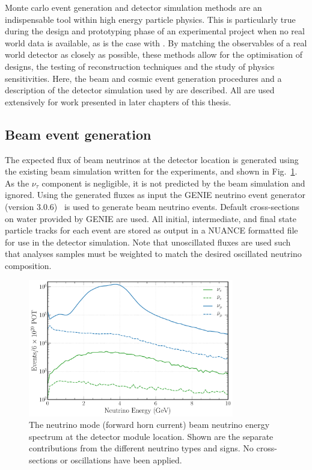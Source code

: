Monte carlo event generation and detector simulation methods are an indispensable tool within high
energy particle physics. This is particularly true during the design and prototyping phase of an
experimental project when no real world data is available, as is the case with \chips. By matching
the observables of a real world detector as closely as possible, these methods allow for the
optimisation of designs, the testing of reconstruction techniques and the study of physics
sensitivities. Here, the beam and cosmic event generation procedures and a description of the
detector simulation used by \chips are described. All are used extensively for work presented in
later chapters of this thesis.

\subsection{Beam event generation} %
\label{sec:chips_monte_carlo_beam} %

The expected flux of beam neutrinos at the \chipsfive detector location is generated using the
existing beam simulation written for the \numi experiments, and shown in Fig.~\ref{fig:flux}. As
the $\nu_{\tau}$ component is negligible, it is not predicted by the beam simulation and ignored.
Using the generated fluxes as input the GENIE neutrino event generator (version
3.0.6)~\cite{andreopoulos2009, andreopoulos2015} is used to generate beam neutrino events. Default
cross-sections on water provided by GENIE are used. All initial, intermediate, and final state
particle tracks for each event are stored as output in a NUANCE formatted file for use in the
detector simulation. Note that unoscillated fluxes are used such that analyses samples must be
weighted to match the desired oscillated neutrino composition.

\begin{figure} %
    \includegraphics[width=0.8\textwidth]{diagrams/4-chips/flux.pdf}
    \caption[\numi neutrino flux at CHIPS.]
    {The neutrino mode (forward horn current) \numi beam neutrino energy spectrum at the
        \chipsfive detector module location. Shown are the separate contributions from the
        different neutrino types and signs. No cross-sections or oscillations have been applied.}
    \label{fig:flux}
\end{figure}

